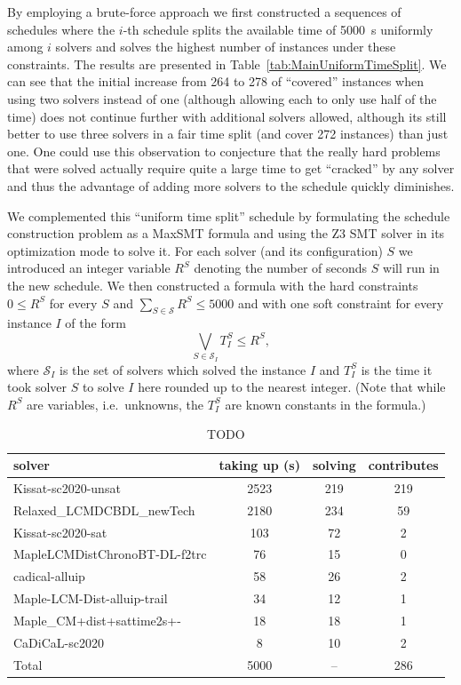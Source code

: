 \documentclass{elsarticle}
\begin{document}
By employing a brute-force approach we first constructed a sequences of schedules 
where the $i$-th schedule splits the available time of \SI{5000}{\second} uniformly among
$i$ solvers and solves the highest number of instances under these constraints.
The results are presented in Table~\ref{tab:MainUniformTimeSplit}.
We can see that the initial increase from 264 to 278 of ``covered'' instances 
when using two solvers instead of one (although allowing each to only use half of the time)
does not continue further with additional solvers allowed,
although its still better to use three solvers in a fair time split 
(and cover 272 instances) than just one.
One could use this observation to conjecture that the really hard 
problems that were solved actually require quite a large time to 
get ``cracked'' by any solver and thus the advantage of adding more solvers to the schedule
quickly diminishes.

We complemented this ``uniform time split'' schedule by formulating the schedule construction
problem as a MaxSMT formula and using the Z3 SMT solver \cite{DBLP:conf/tacas/MouraB08} in its optimization mode \cite{DBLP:conf/sycss/BjornerP14} to solve it.
For each solver (and its configuration) $S$ we introduced an integer variable $R^S$ denoting 
the number of seconds $S$ will run in the new schedule. We then constructed a formula with the hard
constraints $0 \leq R^S$ for every $S$ and $\sum_{S\in\mathcal{S}} R^S \leq 5000$ and with one 
soft constraint for every instance $I$ of the form
\[\bigvee_{S \in \mathcal{S}_I} T^S_I \leq R^S,\]
where $\mathcal{S}_I$ is the set of solvers which solved the instance $I$ and $T^S_I$ is the time it took solver $S$ to solve $I$ here rounded up to the nearest integer.
(Note that while $R^S$ are variables, i.e.~unknowns, the $T^S_I$ are known constants in the formula.)

\begin{table}
\caption{TODO}
\label{tab:MainZ3Schedule}
\begin{center}
\begin{tabular}{lccc}
solver & taking up (s) & solving & contributes \\
\hline
Kissat-sc2020-unsat & 2523 & 219 & 219 \\
Relaxed\_LCMDCBDL\_newTech & 2180 & 234 & \phantom{0}59 \\
Kissat-sc2020-sat & 103 & \phantom{0}72 & \phantom{00}2 \\
MapleLCMDistChronoBT-DL-f2trc & \phantom{0}76 & \phantom{0}15 & \phantom{00}0 \\
cadical-alluip & \phantom{0}58 & \phantom{0}26 & \phantom{00}2 \\
Maple-LCM-Dist-alluip-trail & \phantom{0}34 & \phantom{0}12 & \phantom{00}1 \\
Maple\_CM+dist+sattime2s+- & \phantom{0}18 & \phantom{0}18 & \phantom{00}1 \\
CaDiCaL-sc2020 & \phantom{00}8 & \phantom{0}10 & \phantom{00}2 \\
\hline 
Total & 5000 & \phantom{0}-- & 286 \\ 
\end{tabular}
\end{center}
\end{table}
\end{document}
